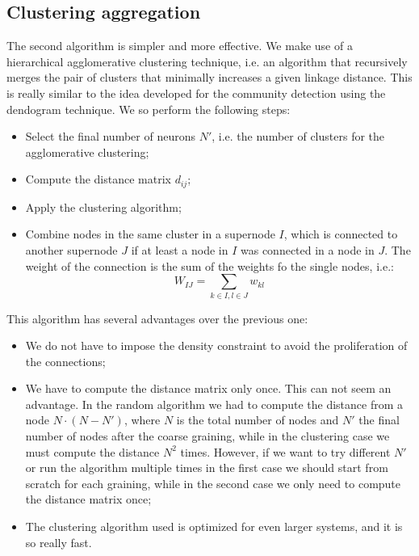 \subsection{Clustering aggregation \label{subsec:clust}}
The second algorithm is simpler and more effective. We make use of a hierarchical agglomerative
clustering technique, i.e. an algorithm that recursively merges the pair of clusters that 
minimally increases a given linkage distance. This is really similar to the idea developed 
for the community detection using the dendogram technique.
We so perform the following steps:
\begin{itemize}
    \item Select the  final number of neurons $N'$, i.e. the number of clusters for the agglomerative
        clustering;
    \item Compute the distance matrix $d_{ij}$;
    \item Apply the clustering algorithm;
    \item Combine nodes in the same cluster in a supernode $I$, which is connected to another 
        supernode $J$ if at least a node in $I$ was connected in a node in $J$. The weight of the 
        connection is the sum of the weights fo the single nodes, i.e.:
        $$
        W_{IJ} = \sum_{k\in I, l\in J} w_{kl}
        $$
\end{itemize}
This algorithm has several advantages over the previous one:
\begin{itemize}
    \item We do not have to impose the density constraint to avoid the proliferation of the 
        connections;
    \item We have to compute the distance matrix only once. This can not seem an advantage.
        In the random algorithm we had to compute the distance from a node $N\cdot (N-N')$,
        where $N$ is the total number of nodes and $N'$ the final number of nodes after the 
        coarse graining, while in the clustering case we must compute the distance $N^2$ times.
        However, if we want to try different $N'$ or run the algorithm multiple times in the 
        first case we should start from scratch for each graining, while in the second case
        we only need to compute the distance matrix once;
    \item The clustering algorithm used is optimized for even larger systems, and it is so really
        fast.
\end{itemize}



